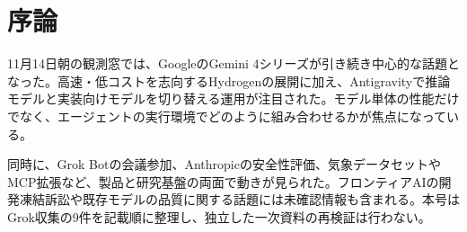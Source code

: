 \section{序論}
11月14日朝の観測窓では、GoogleのGemini 4シリーズが引き続き中心的な話題となった。高速・低コストを志向するHydrogenの展開に加え、Antigravityで推論モデルと実装向けモデルを切り替える運用が注目された。モデル単体の性能だけでなく、エージェントの実行環境でどのように組み合わせるかが焦点になっている。

同時に、Grok Botの会議参加、Anthropicの安全性評価、気象データセットやMCP拡張など、製品と研究基盤の両面で動きが見られた。フロンティアAIの開発凍結訴訟や既存モデルの品質に関する話題には未確認情報も含まれる。本号はGrok収集の9件を記載順に整理し、独立した一次資料の再検証は行わない。